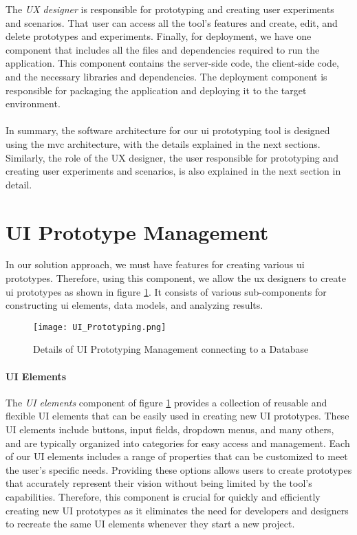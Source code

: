 The \textit{UX designer} is responsible for prototyping and creating user experiments and scenarios. 
That user can access all the tool's features and create, edit, and delete prototypes and experiments.
Finally, for deployment, we have one component that includes all the files and dependencies required to run the application. 
This component contains the server-side code, the client-side code, and the necessary libraries and dependencies. 
The deployment component is responsible for packaging the application and deploying it to the target environment.\\\\
In summary, the software architecture for our \ac{ui} prototyping tool is designed using the \ac{mvc} architecture, with the details explained in the next sections. 
Similarly, the role of the UX designer, the user responsible for prototyping and creating user experiments and scenarios, is also explained in the next section in detail.

\clearpage
\section{UI Prototype Management}
\label{sc:section:prototyping}
In our solution approach, we must have features for creating various \ac{ui} prototypes.
Therefore, using this component, we allow the \ac{ux} designers to create \ac{ui} prototypes as shown in figure \ref{fig:sc:prototyping}.
It consists of various sub-components for constructing \ac{ui} elements, data models, and analyzing results.
\begin{figure}[htbp!]
    \centering    
    \texttt{[image: UI\_Prototyping.png]} 
    \caption[Details of UI Prototyping Management]{Details of UI Prototyping Management connecting to a Database}
    \label{fig:sc:prototyping}
\end{figure}

\paragraph{UI Elements}
The \textit{UI elements} component of figure \ref{fig:sc:prototyping} provides a collection of reusable and flexible UI elements that can be easily used in creating new UI prototypes.
These UI elements include buttons, input fields, dropdown menus, and many others, and are typically organized into categories for easy access and management. 
Each of our UI elements includes a range of properties that can be customized to meet the user's specific needs. 
Providing these options allows users to create prototypes that accurately represent their vision without being limited by the tool's capabilities.
Therefore, this component is crucial for quickly and efficiently creating new UI prototypes as it eliminates the need for developers and designers to recreate the same UI elements whenever they start a new project.

